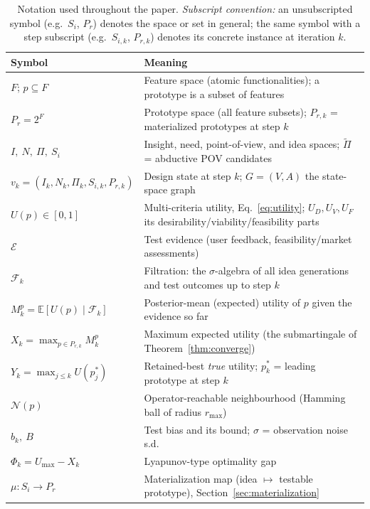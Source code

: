 \documentclass[11pt]{article}
\newcommand{\E}{\mathbb{E}}
\newcommand{\evidence}{\mathcal{E}} %
\newcommand{\filt}{\mathcal{F}}     %
\begin{document}
\begin{table}[h!]
\centering
\caption{Notation used throughout the paper. \emph{Subscript convention:} an unsubscripted symbol (e.g.\ $S_i$, $P_r$) denotes the space or set in general; the same symbol with a step subscript (e.g.\ $S_{i,k}$, $P_{r,k}$) denotes its concrete instance at iteration $k$.}
\label{tab:notation}
\footnotesize
\setlength{\tabcolsep}{6pt}
\begin{tabularx}{\textwidth}{@{}>{\raggedright\arraybackslash}p{} >{\raggedright\arraybackslash}X@{}}
\toprule
\textbf{Symbol} & \textbf{Meaning} \\
\midrule
$F$; $p\subseteq F$ & Feature space (atomic functionalities); a prototype is a subset of features \\
$P_r=2^F$ & Prototype space (all feature subsets); $P_{r,k}$ = materialized prototypes at step $k$ \\
$I,\ N,\ \Pi,\ S_i$ & Insight, need, point-of-view, and idea spaces; $\widetilde{\Pi}$ = abductive POV candidates \\
$v_k=(I_k,N_k,\Pi_{k},S_{i,k},P_{r,k})$ & Design state at step $k$; $G=(V,A)$ the state-space graph \\
$U(p)\in[0,1]$ & Multi-criteria utility, Eq.~\eqref{eq:utility}; $U_D,U_V,U_F$ its desirability/viability/feasibility parts \\
$\evidence$ & Test evidence (user feedback, feasibility/market assessments) \\
$\filt_k$ & Filtration: the $\sigma$-algebra of all idea generations and test outcomes up to step $k$ \\
$M_k^p=\E[U(p)\mid\filt_k]$ & Posterior-mean (expected) utility of $p$ given the evidence so far \\
$X_k=\max_{p\in P_{r,k}} M_k^p$ & Maximum expected utility (the submartingale of Theorem~\ref{thm:converge}) \\
$Y_k=\max_{j\le k}U(p_j^*)$ & Retained-best \emph{true} utility; $p_k^*$ = leading prototype at step $k$ \\
$\mathcal{N}(p)$ & Operator-reachable neighbourhood (Hamming ball of radius $r_{\max}$) \\
$b_k,\ B$ & Test bias and its bound; $\sigma$ = observation noise s.d. \\
$\Phi_k=U_{\max}-X_k$ & Lyapunov-type optimality gap \\
$\mu:S_i\to P_r$ & Materialization map (idea $\mapsto$ testable prototype), Section~\ref{sec:materialization} \\

\end{tabularx}
\end{table}
\end{document}

